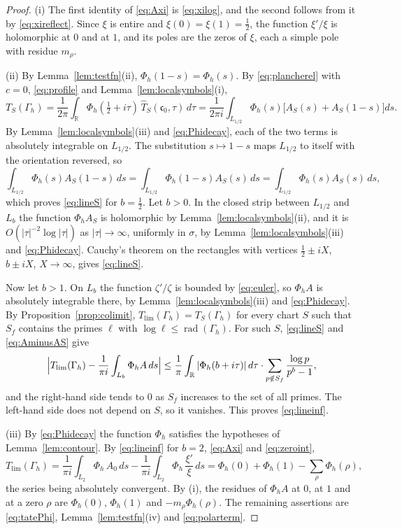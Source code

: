 \documentclass[11pt]{amsart}
\theoremstyle{remark}
\numberwithin{equation}{section}
\newcommand{\R}{\mathbb R}
\newcommand{\rd}{\operatorname{rad}}
\newcommand{\cz}{\mathfrak c_0}
\newcommand{\Tl}{T_{\lim}}
\begin{document}
\begin{proof}
(i) The first identity of \eqref{eq:Axi} is \eqref{eq:xilog}, and the second
follows from it by \eqref{eq:xireflect}.  Since $\xi$ is entire and
$\xi(0)=\xi(1)=\tfrac12$, the function $\xi'/\xi$ is holomorphic at $0$ and
at $1$, and its poles are the zeros of $\xi$, each a simple pole with residue
$m_\rho$.

(ii) By Lemma~\ref{lem:testfn}(ii), $\Phi_h(1-s)=\Phi_h(s)$.  By
\eqref{eq:plancherel} with $c=0$, \eqref{eq:profile} and
Lemma~\ref{lem:localsymbols}(i),
\[
  T_S(\Gamma_h)=\frac1{2\pi}\int_\R\Phi_h(\tfrac12+i\tau)\,
     \widehat T_S(\cz,\tau)\,d\tau
  =\frac1{2\pi i}\int_{L_{1/2}}\Phi_h(s)\bigl[A_S(s)+A_S(1-s)\bigr]ds .
\]
By Lemma~\ref{lem:localsymbols}(iii) and \eqref{eq:Phidecay}, each of the two
terms is absolutely integrable on $L_{1/2}$.  The substitution
$s\mapsto1-s$ maps $L_{1/2}$ to itself with the orientation reversed, so
\[
  \int_{L_{1/2}}\Phi_h(s)A_S(1-s)\,ds=\int_{L_{1/2}}\Phi_h(1-s)A_S(s)\,ds
  =\int_{L_{1/2}}\Phi_h(s)A_S(s)\,ds ,
\]
which proves \eqref{eq:lineS} for $b=\tfrac12$.  Let $b>0$.  In the closed
strip between $L_{1/2}$ and $L_b$ the function $\Phi_hA_S$ is holomorphic by
Lemma~\ref{lem:localsymbols}(ii), and it is $O(|\tau|^{-2}\log|\tau|)$ as
$|\tau|\to\infty$, uniformly in $\sigma$, by
Lemma~\ref{lem:localsymbols}(iii) and \eqref{eq:Phidecay}.  Cauchy's theorem
on the rectangles with vertices $\tfrac12\pm iX$, $b\pm iX$, $X\to\infty$,
gives \eqref{eq:lineS}.

Now let $b>1$.  On $L_b$ the function $\zeta'/\zeta$ is bounded by
\eqref{eq:euler}, so $\Phi_hA$ is absolutely integrable there, by
Lemma~\ref{lem:localsymbols}(iii) and \eqref{eq:Phidecay}.  By
Proposition~\ref{prop:colimit}, $\Tl(\Gamma_h)=T_S(\Gamma_h)$ for every chart
$S$ such that $S_f$ contains the primes $\ell$ with
$\log\ell\le\rd(\Gamma_h)$.  For such $S$, \eqref{eq:lineS} and
\eqref{eq:AminusAS} give
\[
  \Bigl|\Tl(\Gamma_h)-\frac1{\pi i}\int_{L_b}\Phi_hA\,ds\Bigr|
  \le\frac1\pi\int_\R|\Phi_h(b+i\tau)|\,d\tau\cdot
  \sum_{p\notin S_f}\frac{\log p}{p^b-1},
\]
and the right-hand side tends to $0$ as $S_f$ increases to the set of all
primes.  The left-hand side does not depend on $S$, so it vanishes.  This
proves \eqref{eq:lineinf}.

(iii) By \eqref{eq:Phidecay} the function $\Phi_h$ satisfies the
hypotheses of Lemma~\ref{lem:contour}.  By \eqref{eq:lineinf} for $b=2$,
\eqref{eq:Axi} and \eqref{eq:zeroint},
\[
  \Tl(\Gamma_h)=\frac1{\pi i}\int_{L_2}\Phi_h\,A_0\,ds
   -\frac1{\pi i}\int_{L_2}\Phi_h\,\frac{\xi'}{\xi}\,ds
  =\Phi_h(0)+\Phi_h(1)-\sum_\rho\Phi_h(\rho),
\]
the series being absolutely convergent.  By (i), the residues of $\Phi_hA$ at
$0$, at $1$ and at a zero $\rho$ are $\Phi_h(0)$, $\Phi_h(1)$ and
$-m_\rho\Phi_h(\rho)$.  The remaining assertions are \eqref{eq:tatePhi},
Lemma~\ref{lem:testfn}(iv) and \eqref{eq:polarterm}.
\end{proof}
\end{document}
